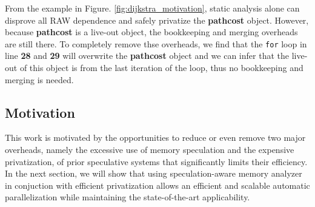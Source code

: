 From the example in Figure. \ref{fig:dijkstra_motivation}, static analysis
alone can disprove all RAW dependence and safely privatize the
\textbf{pathcost} object. However, because \textbf{pathcost} is a live-out
object, the bookkeeping and merging overheads are still there. To
completely remove thse overheads, we find that the \texttt{for} loop in
line \textbf{28} and \textbf{29} will overwrite the \textbf{pathcost}
object and we can infer that the live-out of this object is from the last
iteration of the loop, thus no bookkeeping and merging is needed.

\subsection{Motivation}
This work is motivated by the opportunities to reduce or even remove two
major overheads, namely the excessive use of memory speculation and the
expensive privatization, of prior speculative systems that significantly
limits their efficiency.
%
In the next section, we will show that using speculation-aware memory
analyzer in conjuction with efficient privatization allows an efficient and
scalable automatic parallelization while maintaining the state-of-the-art
applicability.






